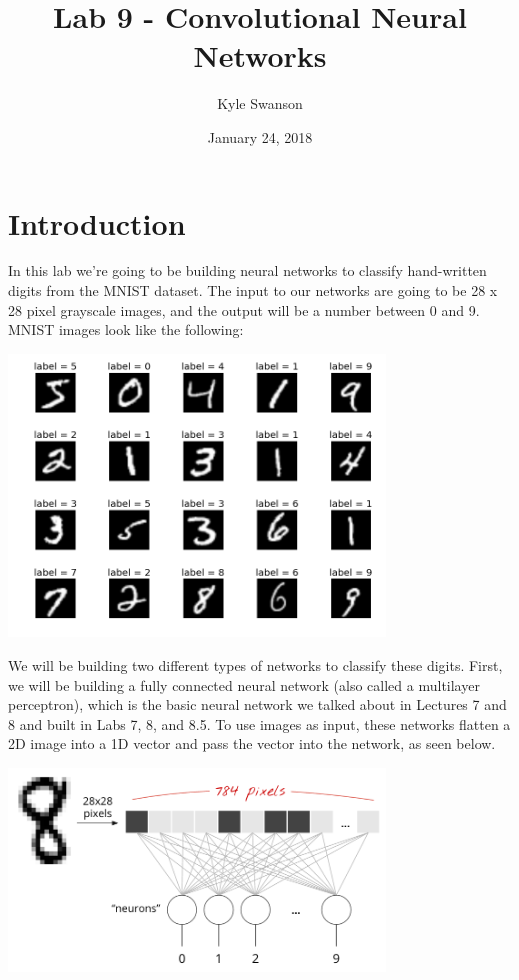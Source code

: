 \documentclass{article}
\title{Lab 9 - Convolutional Neural Networks}
\author{Kyle Swanson}
\date{January 24, 2018}
\begin{document}
\maketitle

\section{Introduction}

In this lab we're going to be building neural networks to classify hand-written digits from the MNIST dataset. The input to our networks are going to be 28 x 28 pixel grayscale images, and the output will be a number between 0 and 9. MNIST images look like the following:

\begin{center}
    \includegraphics[width=0.75\textwidth]{mnist.png}
\end{center}

We will be building two different types of networks to classify these digits. First, we will be building a fully connected neural network (also called a multilayer perceptron), which is the basic neural network we talked about in Lectures 7 and 8 and built in Labs 7, 8, and 8.5. To use images as input, these networks flatten a 2D image into a 1D vector and pass the vector into the network, as seen below.

\begin{center}
\includegraphics[width=0.75\textwidth]{mnist_fc.png}
\end{center}
\end{document}
